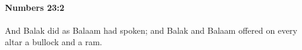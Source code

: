 
		\paragraph{Numbers 23:2} %
			\label{NUMBERS-23-2}

			And Balak did as Balaam had spoken; and Balak and Balaam offered on every altar a bullock and a ram.


